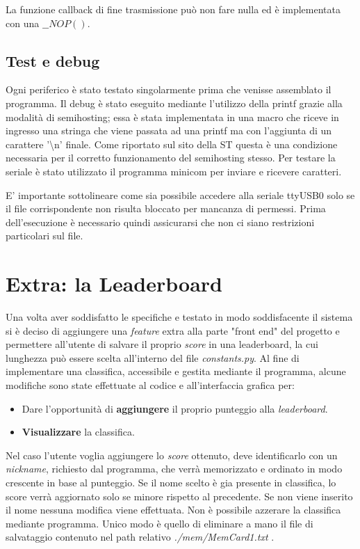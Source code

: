 \documentclass[a4paper]{article}
\begin{document}
		La funzione callback di fine trasmissione può non fare nulla ed è implementata con una \textbf{$\_\_NOP()$}.

	\subsection{Test e debug}
		Ogni periferico è stato testato singolarmente prima che venisse assemblato il programma. Il debug è stato eseguito mediante l'utilizzo della printf grazie alla modalità di semihosting; essa è stata implementata in una macro che riceve in ingresso una stringa che viene passata ad una printf ma con l'aggiunta di un carattere '\textbackslash n' finale. Come riportato sul sito della ST questa è una condizione necessaria per il corretto funzionamento del semihosting stesso.
		Per testare la seriale è stato utilizzato il programma minicom per inviare e ricevere caratteri.

		E' importante sottolineare come sia possibile accedere alla seriale ttyUSB0 solo se il file corrispondente non risulta bloccato per mancanza di permessi. Prima dell'esecuzione è necessario quindi assicurarsi che non ci siano restrizioni particolari sul file.
\section{Extra: la Leaderboard}
		Una volta aver soddisfatto le specifiche e testato in modo soddisfacente il sistema si è deciso di aggiungere una \textit{feature} extra alla parte "front end" del progetto e permettere all'utente di salvare il proprio \textit{score} in una leaderboard, la cui lunghezza può essere scelta all'interno del file \textit{constants.py}. \newline
		Al fine di implementare una classifica, accessibile e gestita mediante il programma, alcune modifiche sono state effettuate al codice e all'interfaccia grafica per:
		\begin{itemize}
			\item Dare l'opportunità di \textbf{aggiungere} il proprio punteggio alla \textit{leaderboard}.
			\item \textbf{Visualizzare} la classifica.
		\end{itemize}
		Nel caso l'utente voglia aggiungere lo \textit{score} ottenuto, deve identificarlo con un \textit{nickname}, richiesto dal programma, che verrà memorizzato e ordinato in modo crescente in base al punteggio. Se il nome scelto è gia presente in classifica, lo score verrà aggiornato solo se minore rispetto al precedente. Se non viene inserito il nome nessuna modifica viene effettuata.\newline
		Non è possibile azzerare la classifica mediante programma. Unico modo è quello di eliminare a mano il file di salvataggio contenuto nel path relativo \textit{./mem/MemCard1.txt} .
\end{document}
